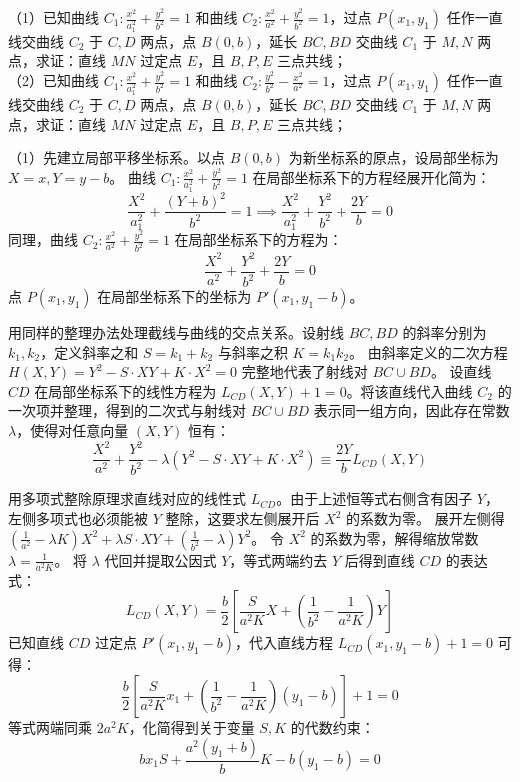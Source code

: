 \begin{exercise}
（1）已知曲线 \(C_1: \frac{x^2}{a_1^2} + \frac{y^2}{b^2} = 1\) 和曲线 \(C_2: \frac{x^2}{a^2} + \frac{y^2}{b^2} = 1\)，过点 \(P(x_1, y_1)\) 任作一直线交曲线 \(C_2\) 于 \(C, D\) 两点，点 \(B\left(0, b\right)\)，延长 \(BC, BD\) 交曲线 \(C_1\) 于 \(M, N\) 两点，求证：直线 \(MN\) 过定点 \(E\)，且 \(B, P, E\) 三点共线；\\
（2）已知曲线 \(C_1: \frac{x^2}{a_1^2} + \frac{y^2}{b^2} = 1\) 和曲线 \(C_2:  \frac{y^2}{b^2}-\frac{x^2}{a^2} = 1\)，过点 \(P(x_1, y_1)\) 任作一直线交曲线 \(C_2\) 于 \(C, D\) 两点，点 \(B\left(0, b\right)\)，延长 \(BC, BD\) 交曲线 \(C_1\) 于 \(M, N\) 两点，求证：直线 \(MN\) 过定点 \(E\)，且 \(B, P, E\) 三点共线；
\end{exercise}
\begin{solution}
（1）先建立局部平移坐标系。以点 $B(0,b)$ 为新坐标系的原点，设局部坐标为 $X = x, Y = y - b$。
曲线 $C_1: \frac{x^2}{a_1^2} + \frac{y^2}{b^2} = 1$ 在局部坐标系下的方程经展开化简为：
$$ \frac{X^2}{a_1^2} + \frac{(Y+b)^2}{b^2} = 1 \implies \frac{X^2}{a_1^2} + \frac{Y^2}{b^2} + \frac{2Y}{b} = 0 $$
同理，曲线 $C_2: \frac{x^2}{a^2} + \frac{y^2}{b^2} = 1$ 在局部坐标系下的方程为：
$$ \frac{X^2}{a^2} + \frac{Y^2}{b^2} + \frac{2Y}{b} = 0 $$
点 $P(x_1, y_1)$ 在局部坐标系下的坐标为 $P'(x_1, y_1-b)$。

用同样的整理办法处理截线与曲线的交点关系。设射线 $BC, BD$ 的斜率分别为 $k_1, k_2$，定义斜率之和 $S = k_1 + k_2$ 与斜率之积 $K = k_1 k_2$。
由斜率定义的二次方程 $H(X,Y) = Y^2 - S \cdot XY + K \cdot X^2 = 0$ 完整地代表了射线对 $BC \cup BD$。
设直线 $CD$ 在局部坐标系下的线性方程为 $L_{CD}(X,Y) + 1 = 0$。将该直线代入曲线 $C_2$ 的一次项并整理，得到的二次式与射线对 $BC\cup BD$ 表示同一组方向，因此存在常数 $\lambda$，使得对任意向量 $(X,Y)$ 恒有：
$$ \frac{X^2}{a^2} + \frac{Y^2}{b^2} - \lambda (Y^2 - S \cdot XY + K \cdot X^2) \equiv \frac{2Y}{b} L_{CD}(X,Y) $$

用多项式整除原理求直线对应的线性式 $L_{CD}$。由于上述恒等式右侧含有因子 $Y$，左侧多项式也必须能被 $Y$ 整除，这要求左侧展开后 $X^2$ 的系数为零。
展开左侧得 $\left(\frac{1}{a^2} - \lambda K\right)X^2 + \lambda S \cdot XY + \left(\frac{1}{b^2} - \lambda\right)Y^2$。
令 $X^2$ 的系数为零，解得缩放常数 $\lambda = \frac{1}{a^2 K}$。
将 $\lambda$ 代回并提取公因式 $Y$，等式两端约去 $Y$ 后得到直线 $CD$ 的表达式：
$$ L_{CD}(X,Y) = \frac{b}{2} \left[ \frac{S}{a^2 K} X + \left(\frac{1}{b^2} - \frac{1}{a^2 K}\right)Y \right] $$
已知直线 $CD$ 过定点 $P'(x_1, y_1-b)$，代入直线方程 $L_{CD}(x_1, y_1-b) + 1 = 0$ 可得：
$$ \frac{b}{2} \left[ \frac{S}{a^2 K} x_1 + \left(\frac{1}{b^2} - \frac{1}{a^2 K}\right)(y_1-b) \right] + 1 = 0 $$
等式两端同乘 $2a^2 K$，化简得到关于变量 $S, K$ 的代数约束：
$$ b x_1 S + \frac{a^2(y_1+b)}{b} K - b(y_1-b) = 0 $$


\end{solution}
